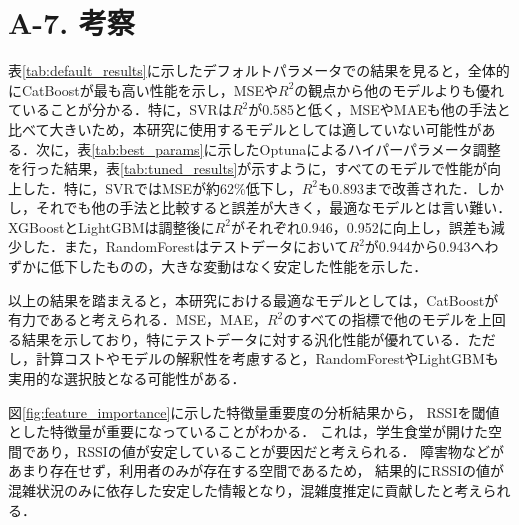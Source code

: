 \section*{A-7. 考察}
表\ref{tab:default_results}に示したデフォルトパラメータでの結果を見ると，全体的にCatBoostが最も高い性能を示し，MSEや$R^2$の観点から他のモデルよりも優れていることが分かる．特に，SVRは$R^2$が0.585と低く，MSEやMAEも他の手法と比べて大きいため，本研究に使用するモデルとしては適していない可能性がある．次に，表\ref{tab:best_params}に示したOptunaによるハイパーパラメータ調整を行った結果，表\ref{tab:tuned_results}が示すように，すべてのモデルで性能が向上した．特に，SVRではMSEが約62\%低下し，$R^2$も0.893まで改善された．しかし，それでも他の手法と比較すると誤差が大きく，最適なモデルとは言い難い．XGBoostとLightGBMは調整後に$R^2$がそれぞれ0.946，0.952に向上し，誤差も減少した．また，RandomForestはテストデータにおいて$R^2$が0.944から0.943へわずかに低下したものの，大きな変動はなく安定した性能を示した．

以上の結果を踏まえると，本研究における最適なモデルとしては，CatBoostが有力であると考えられる．MSE，MAE，$R^2$のすべての指標で他のモデルを上回る結果を示しており，特にテストデータに対する汎化性能が優れている．ただし，計算コストやモデルの解釈性を考慮すると，RandomForestやLightGBMも実用的な選択肢となる可能性がある．

図\ref{fig:feature_importance}に示した特徴量重要度の分析結果から，
RSSIを閾値とした特徴量が重要になっていることがわかる．
これは，学生食堂が開けた空間であり，RSSIの値が安定していることが要因だと考えられる．
障害物などがあまり存在せず，利用者のみが存在する空間であるため，
結果的にRSSIの値が混雑状況のみに依存した安定した情報となり，混雑度推定に貢献したと考えられる．
